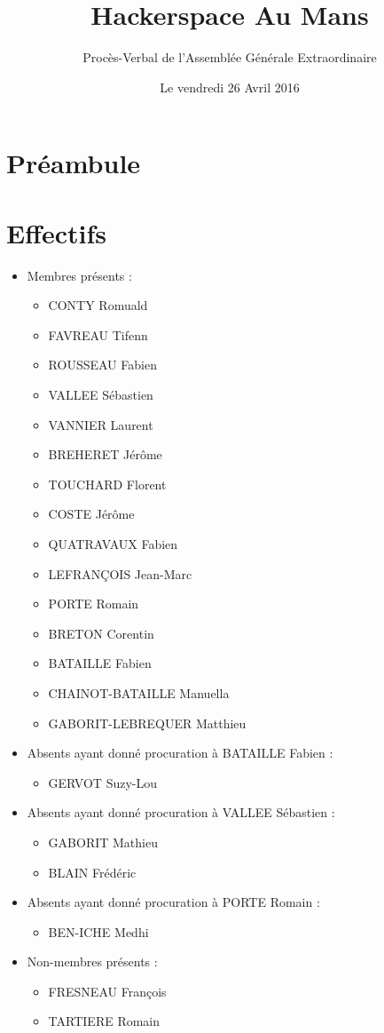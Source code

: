 \documentclass[a4paper, 11pt]{article}
\title{Hackerspace Au Mans}
\author{Procès-Verbal de l'Assemblée Générale Extraordinaire}
\date{Le vendredi 26 Avril 2016}
\begin{document}
\maketitle

\section*{Préambule}

\section{Effectifs}

\begin{itemize}
	\item Membres présents : 
		\begin{itemize}
            \item CONTY Romuald
            \item FAVREAU Tifenn
            \item ROUSSEAU Fabien
            \item VALLEE Sébastien
            \item VANNIER Laurent 
            \item BREHERET Jérôme
            \item TOUCHARD Florent
            \item COSTE Jérôme
            \item QUATRAVAUX Fabien
            \item LEFRANÇOIS Jean-Marc
            \item PORTE Romain
            \item BRETON Corentin
            \item BATAILLE Fabien
            \item CHAINOT-BATAILLE Manuella
            \item GABORIT-LEBREQUER Matthieu
		\end{itemize}
	\item Absents ayant donné procuration à BATAILLE Fabien :
		\begin{itemize}
			\item GERVOT Suzy-Lou
		\end{itemize}
	\item Absents ayant donné procuration à VALLEE Sébastien :
		\begin{itemize}
			\item GABORIT Mathieu
			\item BLAIN Frédéric
		\end{itemize}
	\item Absents ayant donné procuration à PORTE Romain :
		\begin{itemize}
			\item BEN-ICHE Medhi
		\end{itemize}
	\item Non-membres présents :
    	\begin{itemize}
    	    \item FRESNEAU François
            \item TARTIERE Romain
    	\end{itemize}
\end{itemize}
\end{document}

